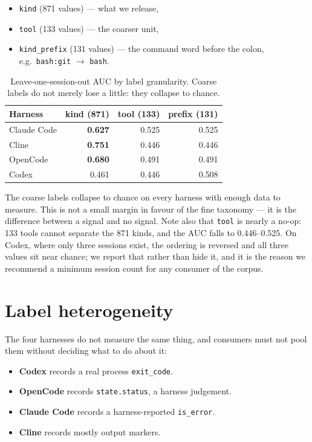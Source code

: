 \documentclass[11pt]{article}
\begin{document}
\begin{itemize}
\item \texttt{kind} (871 values) --- what we release,
\item \texttt{tool} (133 values) --- the coarser unit,
\item \texttt{kind\_prefix} (131 values) --- the command word before the
  colon, e.g.\ \texttt{bash:git} $\rightarrow$ \texttt{bash}.
\end{itemize}

\begin{table}[h]
\centering
\begin{tabular}{lrrr}
\toprule
\textbf{Harness} & \textbf{kind (871)} & \textbf{tool (133)} & \textbf{prefix (131)} \\
\midrule
Claude Code & \textbf{0.627} & 0.525 & 0.525 \\
Cline       & \textbf{0.751} & 0.446 & 0.446 \\
OpenCode    & \textbf{0.680} & 0.491 & 0.491 \\
Codex       & 0.461 & 0.446 & 0.508 \\
\bottomrule
\end{tabular}
\caption{Leave-one-session-out AUC by label granularity. Coarse labels do
not merely lose a little: they collapse to chance.}
\label{tab:granularity}
\end{table}

The coarse labels collapse to chance on every harness with enough data to
measure. This is not a small margin in favour of the fine taxonomy --- it
is the difference between a signal and no signal. Note also that
\texttt{tool} is nearly a no-op: 133 tools cannot separate the 871 kinds,
and the AUC falls to 0.446--0.525. On Codex, where only three sessions
exist, the ordering is reversed and all three values sit near chance; we
report that rather than hide it, and it is the reason we recommend a
minimum session count for any consumer of the corpus.

\section{Label heterogeneity}
\label{sec:heterogeneity}

The four harnesses do not measure the same thing, and consumers must not
pool them without deciding what to do about it:

\begin{itemize}
\item \textbf{Codex} records a real process \texttt{exit\_code}.
\item \textbf{OpenCode} records \texttt{state.status}, a harness judgement.
\item \textbf{Claude Code} records a harness-reported \texttt{is\_error}.
\item \textbf{Cline} records mostly output markers.
\end{itemize}
\end{document}
